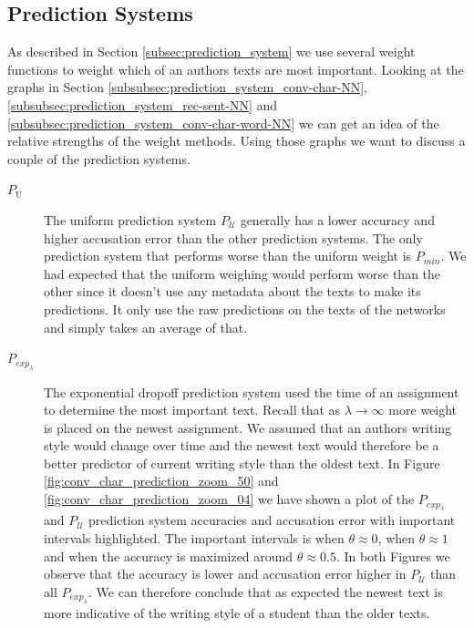 \subsection{Prediction Systems}

As described in Section \ref{subsec:prediction_system} we use several weight
functions to weight which of an authors texts are most important. Looking
at the graphs in Section \ref{subsubsec:prediction_system_conv-char-NN},
\ref{subsubsec:prediction_system_rec-sent-NN} and
\ref{subsubsec:prediction_system_conv-char-word-NN} we can get an idea of the
relative strengths of the weight methods. Using those graphs we want to discuss
a couple of the prediction systems.

\begin{description}

    \item[$P_\mathrm{U}$]

        The uniform prediction system $P_\mathcal{U}$ generally has a lower
        accuracy and higher accusation error than the other prediction systems.
        The only prediction system that performs worse than the uniform weight
        is $P_{min}$. We had expected that the uniform weighing would perform
        worse than the other since it doesn't use any metadata about the texts
        to make its predictions. It only use the raw predictions on the texts of
        the networks and simply takes an average of that.

    \item[$P_{exp_\lambda}$]

        The exponential dropoff prediction system used the time of an
        assignment to determine the most important text. Recall that
        as $\lambda \rightarrow \infty$ more weight is placed on the
        newest assignment. We assumed that an authors writing style
        would change over time and the newest text would therefore be
        a better predictor of current writing style than the oldest
        text. In Figure \ref{fig:conv_char_prediction_zoom_50} and
        \ref{fig:conv_char_prediction_zoom_04} we have shown a plot of the
        $P_{exp_\lambda}$ and $P_\mathcal{U}$ prediction system accuracies and
        accusation error with important intervals highlighted. The important
        intervals is when $\theta \approx 0$, when $\theta \approx 1$ and when
        the accuracy is maximized around $\theta \approx 0.5$. In both Figures
        we observe that the accuracy is lower and accusation error higher in
        $P_\mathcal{U}$ than all $P_{exp_\lambda}$. We can therefore conclude
        that as expected the newest text is more indicative of the writing style
        of a student than the older texts.


\end{description}
